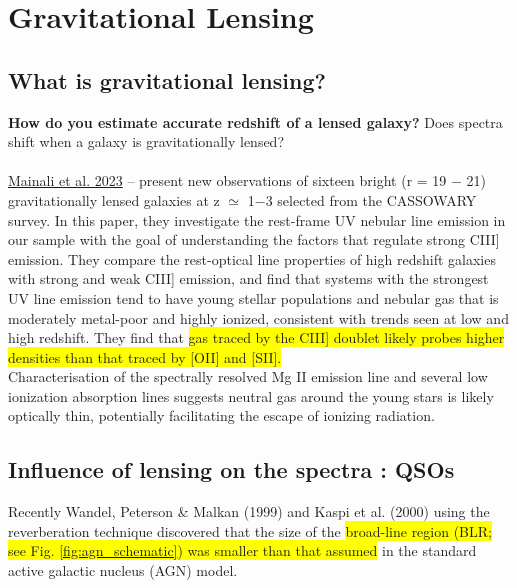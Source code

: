 \chapter{Gravitational Lensing}


\section{What is gravitational lensing?}

\textbf{How do you estimate accurate redshift of a lensed galaxy?}
Does spectra shift when a galaxy is gravitationally lensed?
\\
\\
\href{https://ui.adsabs.harvard.edu/abs/2023arXiv230111264M/abstract}{Mainali et al. 2023} -- present new observations of sixteen bright (r = 19 − 21) gravitationally lensed galaxies at z $\simeq$ 1−3 selected from the CASSOWARY survey. In this paper, they investigate the rest-frame UV nebular line emission in our sample with the goal of understanding the factors that regulate strong CIII] emission. They compare the rest-optical line properties of high redshift galaxies with strong and weak CIII] emission, and find that systems with the strongest UV line emission tend to have young stellar populations and nebular gas that is moderately metal-poor and highly ionized, consistent with trends seen at low and high redshift. They find that \colorbox{yellow}{gas traced by the CIII] doublet likely probes higher densities than that traced by [OII] and [SII].} \\ Characterisation of the spectrally resolved Mg II emission line and several low ionization absorption lines suggests neutral gas around the young stars is likely optically thin, potentially facilitating the escape of ionizing radiation.


\section{Influence of lensing on the spectra : QSOs}

Recently Wandel, Peterson \& Malkan (1999) and Kaspi et al. (2000) using the reverberation technique discovered that the size of the \colorbox{yellow}{broad-line region (BLR; see Fig. \ref{fig:agn_schematic}) was smaller than that assumed} in the standard active galactic nucleus (AGN) model.